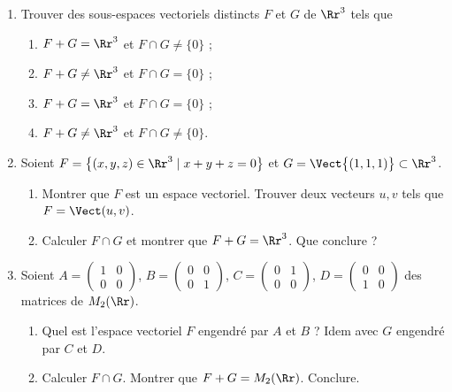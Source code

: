 \documentclass[class=report,crop=false]{standalone}
\begin{document}

\begin{miniexercices}
\sauteligne
\begin{enumerate}

  \item Trouver des sous-espaces vectoriels distincts $F$ et $G$ de $\Rr^3$
  tels que
  \begin{enumerate}
    \item $F+G = \Rr^3$ et $F\cap G \neq \{0\}$ ;
    \item $F+G \neq \Rr^3$ et $F\cap G = \{0\}$ ;
    \item $F+G = \Rr^3$ et $F\cap G = \{0\}$ ;
    \item $F+G \neq \Rr^3$ et $F\cap G \neq \{0\}$.
  \end{enumerate}


  \item Soient $F = \big\{ (x,y,z) \in \Rr^3 \mid x+y+z = 0\big\}$ et
  $G = \Vect \big\{ (1,1,1) \big\} \subset \Rr^3$.
  \begin{enumerate}
    \item Montrer que $F$ est un espace vectoriel. Trouver deux vecteurs $u,v$
    tels que $F = \Vect(u,v)$.
    \item Calculer $F \cap G$ et montrer que $F+G = \Rr^3$. Que conclure ?
  \end{enumerate}


  \item Soient $A=\left(\begin{smallmatrix}1 & 0 \\ 0 & 0 \end{smallmatrix}\right)$,
  $B=\left(\begin{smallmatrix}0 & 0 \\ 0 & 1\end{smallmatrix}\right)$,
  $C=\left(\begin{smallmatrix}0 & 1 \\ 0 & 0\end{smallmatrix}\right)$,
  $D=\left(\begin{smallmatrix}0 & 0 \\ 1 & 0\end{smallmatrix}\right)$ des matrices de $M_2(\Rr)$.
  \begin{enumerate}
    \item Quel est l'espace vectoriel $F$ engendré par $A$ et $B$ ? Idem avec $G$ engendré par $C$ et $D$.
    \item Calculer $F\cap G$. Montrer que $F+G = M_2(\Rr)$. Conclure.
  \end{enumerate}

\end{enumerate}
\end{miniexercices}
\end{document}
